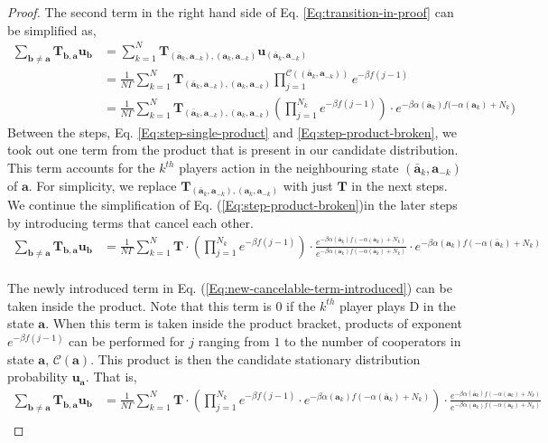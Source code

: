 \documentclass[11pt]{article}
\theoremstyle{plainCl1}
\theoremstyle{plainCl2}
\newcommand{\abf}{\mathbf{a}}
\newcommand{\bbf}{\mathbf{b}}
\newcommand{\T}{\mathbf{T}}
\newcommand{\ubf}{\mathbf{u}}
\newcommand{\D}{\mathrm{D}}
\begin{document}
\begin{proof}
The second term in the right hand side of Eq. \ref{Eq:transition-in-proof} can be simplified as, 
\begin{align}
\sum_{\bbf \neq \abf} \T_{\bbf, \abf} \ubf_{\bbf} &= \sum_{k=1}^N \T_{(\bar{\abf}_k, \abf_{-k}),(\abf_k, \abf_{-k})} \ubf_{(\bar{\abf}_k, \abf_{-k})} \\[10pt]
\label{Eq:step-single-product}
&= \frac{1}{N \Gamma} \sum_{k=1}^N \T_{(\bar{\abf}_k, \abf_{-k}),(\abf_k, \abf_{-k})} \displaystyle \prod_{j=1}^{\mathcal{C}((\bar{\abf}_k, \abf_{-k}))} e^{-\beta f(j-1)}\\[10pt]
&=  \frac{1}{N \Gamma} \sum_{k=1}^N \T_{(\bar{\abf}_k, \abf_{-k}),(\abf_k, \abf_{-k})} \displaystyle \left( \prod_{j=1}^{N_k}  e^{-\beta f(j-1)} \right) \cdot e^{-\beta \alpha(\bar{\abf}_k)f(-\alpha(\abf_k)+ N_k})
\label{Eq:step-product-broken}
\end{align}
Between the steps, Eq. \ref{Eq:step-single-product} and \ref{Eq:step-product-broken}, we took out one term from the product that is present in our candidate distribution. This term accounts for the $k^{th}$ players action in the neighbouring state $(\bar{\abf}_k, \abf_{-k})$ of $\abf$. For simplicity, we replace $\T_{(\bar{\abf}_k, \abf_{-k}),(\abf_k, \abf_{-k})}$ with just $\T$ in the next steps. We continue the simplification of Eq. (\ref{Eq:step-product-broken})in the later steps by introducing terms that cancel each other. \\[10pt]
\begin{align}
\sum_{\bbf \neq \abf} \T_{\bbf, \abf} \ubf_{\bbf} &=  \frac{1}{N \Gamma} \sum_{k=1}^N \T \cdot \displaystyle \left( \prod_{j=1}^{N_k}  e^{-\beta f(j-1)} \right) \cdot \frac{e^{-\beta \alpha(\bar{\abf}_k)f(-\alpha(\abf_k)+ N_k)}}{e^{-\beta \alpha(\abf_k)f(-\alpha(\bar{\abf}_k) +N_k)}} \cdot e^{-\beta \alpha(\abf_k)f(-\alpha(\bar{\abf}_k) + N_k)}
\label{Eq:new-cancelable-term-introduced}
\end{align}
\\ \noindent The newly introduced term in Eq. (\ref{Eq:new-cancelable-term-introduced}) can be taken inside the product. Note that this term is 0 if the $k^{th}$ player plays $\D$ in the state $\abf$. When this term is taken inside the product bracket, products of exponent $e^{-\beta f(j-1)}$ can be performed for $j$ ranging from $1$ to the number of cooperators in state $\abf$, $\mathcal{C}(\abf)$. This product is then the candidate stationary distribution probability $\ubf_\abf$. That is, 
\begin{align}
\sum_{\bbf \neq \abf} \T_{\bbf, \abf} \ubf_{\bbf} &=  \frac{1}{N \Gamma} \sum_{k=1}^N \T \cdot \displaystyle \left( \prod_{j=1}^{N_k}  e^{-\beta f(j-1)} \cdot e^{-\beta \alpha(\abf_k)f(-\alpha(\bar{\abf}_k) + N_k)} \right) \cdot \frac{e^{-\beta \alpha(\bar{\abf}_k)f(-\alpha(\abf_k)+ N_k)}}{e^{-\beta \alpha(\abf_k)f(-\alpha(\bar{\abf}_k) +N_k)}} \\[10pt]

\end{align}
\end{proof}
\end{document}
